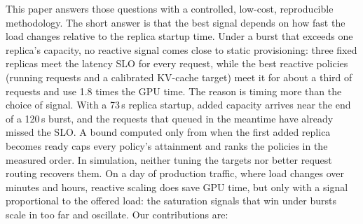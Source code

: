 \documentclass[10pt,conference]{IEEEtran}
\begin{document}
This paper answers those questions with a controlled, low-cost, reproducible
methodology. The short answer is that the best signal depends on how fast the
load changes relative to the replica startup time. Under a burst that exceeds one
replica's capacity, no reactive signal comes close to static provisioning:
three fixed replicas meet the latency SLO for every request, while the best
reactive policies (running requests and a calibrated KV-cache target) meet it
for about a third of requests and use 1.8 times the GPU time. The reason is
timing more than the choice of signal. With a 73\,s replica startup, added
capacity arrives near the end of a 120\,s burst, and the requests that queued
in the meantime have already missed the SLO. A bound computed only from when
the first added replica becomes ready caps every policy's attainment and
ranks the policies in the measured order. In simulation, neither tuning
the targets nor better request routing recovers them. On a day of production
traffic, where load changes over minutes and hours, reactive scaling does
save GPU time, but only with a signal proportional to the offered load: the
saturation signals that win under bursts scale in too far and oscillate. Our
contributions are:
\end{document}
